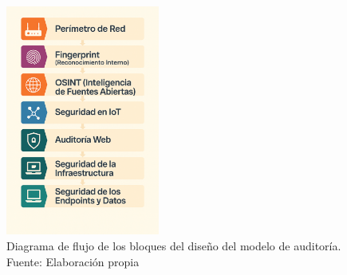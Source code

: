 \documentclass[a4paper, 11pt]{article}
\begin{document}
\begin{figure}[H]
    \centering
    \includegraphics[width=0.45\textwidth]{images/diseno.png}
    \caption{Diagrama de flujo de los bloques del diseño del modelo de auditoría. Fuente: Elaboración propia}
    \label{fig:diseno_modelo_auditoria}
\end{figure}
\end{document}
